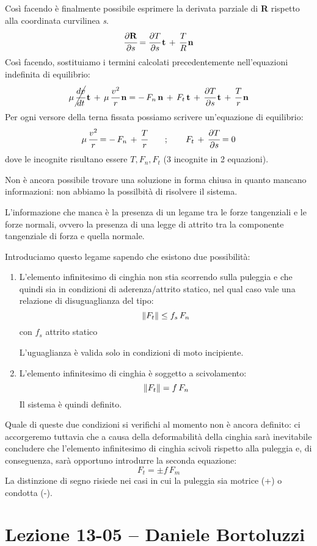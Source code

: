 Così facendo è finalmente possibile esprimere la derivata parziale di \textbf{R} rispetto alla coordinata curvilinea \emph{s}.
\[\cfrac{\partial\mathbf{R}}{\partial s}=\cfrac{\partial T}{\partial s}\,\mathbf{t}\,+\,\cfrac{T}{R}\,\mathbf{n}\]
Così facendo, sostituiamo i termini calcolati precedentemente nell'equazioni indefinita di equilibrio:
\[\mu\,\cancel{\cfrac{dv}{dt}}\,\mathbf{t}\,+\,\mu\,\cfrac{v^2}{r}\,\mathbf{n}=-\,F_n\,\mathbf{n}\,+\,F_t\,\mathbf{t}\,+\, \cfrac{\partial T}{\partial s}\,\mathbf{t}\,+\,\cfrac{T}{r}\,\mathbf{n}\]
Per ogni versore della terna fissata possiamo scrivere un'equazione di equilibrio:
\[\mu\,\cfrac{v^2}{r} = -\,F_n\,+\,\cfrac{T}{r}\qquad;\qquad F_t\,+\,\cfrac{\partial T}{\partial s}=0\]
dove le incognite risultano essere $T, F_n, F_t$ (3 incognite in 2 equazioni).

Non è ancora possibile trovare una soluzione in forma chiusa in quanto mancano informazioni: non abbiamo la possilbità di risolvere il sistema.

L'informazione che manca è la presenza di un legame tra le forze tangenziali e le forze normali, ovvero la presenza di una legge di attrito tra la componente tangenziale di forza e quella normale.

Introduciamo questo legame sapendo che esistono due possibilità: 
\begin{enumerate}
\item L'elemento infinitesimo di cinghia non stia scorrendo sulla puleggia e che quindi sia in condizioni di aderenza/attrito statico, nel qual caso vale una relazione di disuguaglianza del tipo:
\[\lVert F_t\rVert\le f_s\,F_n\]
con $f_s$ attrito statico

L'uguaglianza è valida solo in condizioni di moto incipiente.
\item L'elemento infinitesimo di cinghia è soggetto a scivolamento:
\[\lVert F_t\rVert = f\,F_n\]
Il sistema è quindi definito.
\end{enumerate}

Quale di queste due condizioni si verifichi al momento non è ancora definito: ci accorgeremo tuttavia che a causa della deformabilità della cinghia sarà inevitabile concludere che l'elemento infinitesimo di cinghia scivoli rispetto alla puleggia e, di conseguenza, sarà opportuno introdurre la seconda equazione:
\[F_t = \pm f\,F_m\]
La distinzione di segno risiede nei casi in cui la puleggia sia motrice (+) o condotta (-).

\section{Lezione 13-05 -- Daniele Bortoluzzi}

